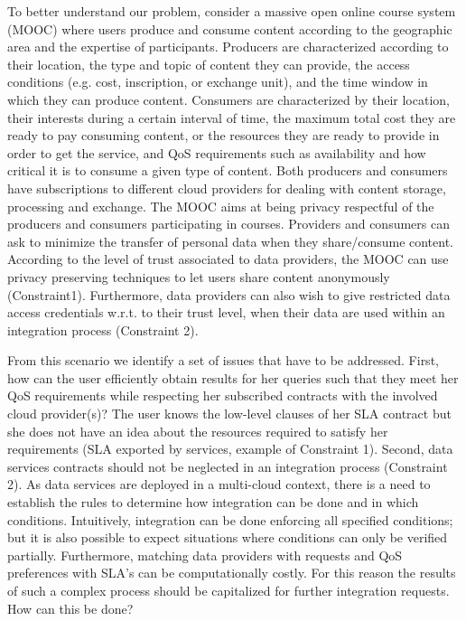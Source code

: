 To better understand our problem, consider a massive open online course system (MOOC) where users produce and consume content according to the geographic area and the expertise of participants. 
Producers are characterized according to their location, the type and topic of  content  they can provide, the access conditions (e.g. cost, inscription, or exchange unit), and the time window in which they can produce content. 
Consumers are characterized by their location, their interests  during a certain interval of time, the maximum total cost they are ready to pay consuming content, or the resources they are ready to provide in order to get the service, and QoS requirements such as availability and how critical it is to consume a given type of content. Both producers and consumers have subscriptions to different cloud providers for dealing with content storage, processing and exchange.
The MOOC  aims at being privacy respectful of the producers and consumers participating in courses.
 Providers  and consumers can ask to minimize the transfer of personal data  when they share/consume content.  According to the level of trust associated to data providers, the MOOC can use privacy preserving techniques to let users share content anonymously  (Constraint1). Furthermore,  data providers can  also wish to give restricted data access credentials w.r.t. to their  trust level, when their data are used  within  an integration process (Constraint 2).  
 

  From this scenario we identify a set of issues that have to be addressed. First, how can the user efficiently obtain  results for her queries such that they meet her QoS requirements while respecting her subscribed contracts with the involved cloud provider(s)?  The user knows the low-level clauses of her SLA contract but she does not have an idea about the resources required to satisfy her requirements (SLA exported by services, example of Constraint 1).  Second, data services contracts should not be neglected in an integration process (Constraint 2).   As data services are deployed in a multi-cloud context, there is a need to establish the rules to determine how integration can be done and in which conditions. Intuitively, integration can be  done enforcing all specified conditions; but it is also possible to  expect situations where conditions can only be verified partially. Furthermore,  matching data providers with requests and QoS preferences with SLA's can be computationally costly. For this reason  the results of  such a  complex process  should be capitalized for further integration requests. How can this be done? 
  
